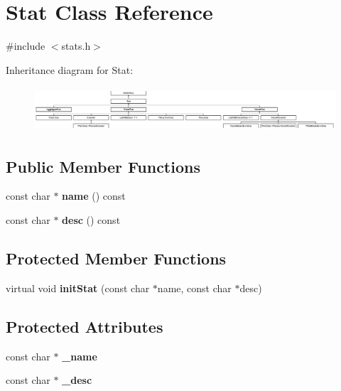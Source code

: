 \hypertarget{classStat}{\section{Stat Class Reference}
\label{classStat}
}


{\ttfamily \#include $<$stats.\-h$>$}

Inheritance diagram for Stat\-:\begin{figure}[H]
\begin{center}
\leavevmode
\includegraphics[height=1.674641cm]{classStat}
\end{center}
\end{figure}
\subsection*{Public Member Functions}
\begin{DoxyCompactItemize}
\item 
\hypertarget{classStat_aea49cf6f8f4f7e5e979bfc7b4530d7f7}{const char $\ast$ {\bfseries name} () const }\label{classStat_aea49cf6f8f4f7e5e979bfc7b4530d7f7}

\item 
\hypertarget{classStat_a698789405d2c18bfbdb405d63df088cb}{const char $\ast$ {\bfseries desc} () const }\label{classStat_a698789405d2c18bfbdb405d63df088cb}

\end{DoxyCompactItemize}
\subsection*{Protected Member Functions}
\begin{DoxyCompactItemize}
\item 
\hypertarget{classStat_ac730651cf624a85fd23a0ff56e1804a3}{virtual void {\bfseries init\-Stat} (const char $\ast$name, const char $\ast$desc)}\label{classStat_ac730651cf624a85fd23a0ff56e1804a3}

\end{DoxyCompactItemize}
\subsection*{Protected Attributes}
\begin{DoxyCompactItemize}
\item 
\hypertarget{classStat_a9cfb802afd755789bd43d46baeafbd9a}{const char $\ast$ {\bfseries \-\_\-name}}\label{classStat_a9cfb802afd755789bd43d46baeafbd9a}

\item 
\hypertarget{classStat_a858ec40e5effcee469853f31f6d34309}{const char $\ast$ {\bfseries \-\_\-desc}}\label{classStat_a858ec40e5effcee469853f31f6d34309}

\end{DoxyCompactItemize}



